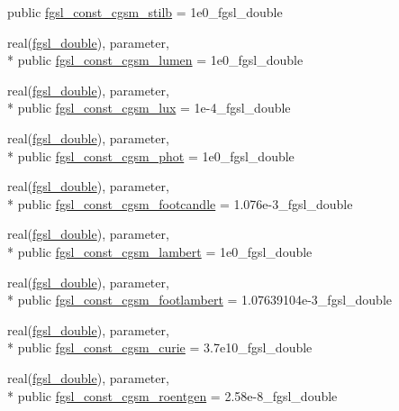 \begin{DoxyCompactItemize}
public \hyperlink{classfgsl_a8f6eb902874b66bc00a4959e7444cb1a}{fgsl\-\_\-const\-\_\-cgsm\-\_\-stilb} = 1e0\-\_\-fgsl\-\_\-double
\item 
real(\hyperlink{classfgsl_a9af5113378e0f000eb479d3f90196ddf}{fgsl\-\_\-double}), parameter, \\*
public \hyperlink{classfgsl_a754f063aac1363ab86693605311aeaf8}{fgsl\-\_\-const\-\_\-cgsm\-\_\-lumen} = 1e0\-\_\-fgsl\-\_\-double
\item 
real(\hyperlink{classfgsl_a9af5113378e0f000eb479d3f90196ddf}{fgsl\-\_\-double}), parameter, \\*
public \hyperlink{classfgsl_aba54a122b0e64f01ac54513a4a0f6a9f}{fgsl\-\_\-const\-\_\-cgsm\-\_\-lux} = 1e-\/4\-\_\-fgsl\-\_\-double
\item 
real(\hyperlink{classfgsl_a9af5113378e0f000eb479d3f90196ddf}{fgsl\-\_\-double}), parameter, \\*
public \hyperlink{classfgsl_a97e19ca0cdcef10fb78328e155bc5671}{fgsl\-\_\-const\-\_\-cgsm\-\_\-phot} = 1e0\-\_\-fgsl\-\_\-double
\item 
real(\hyperlink{classfgsl_a9af5113378e0f000eb479d3f90196ddf}{fgsl\-\_\-double}), parameter, \\*
public \hyperlink{classfgsl_ab94d2a4bddeb2056b97285714a740131}{fgsl\-\_\-const\-\_\-cgsm\-\_\-footcandle} = 1.\-076e-\/3\-\_\-fgsl\-\_\-double
\item 
real(\hyperlink{classfgsl_a9af5113378e0f000eb479d3f90196ddf}{fgsl\-\_\-double}), parameter, \\*
public \hyperlink{classfgsl_a9dcbf51e3d416e2da01a503e5ba573bc}{fgsl\-\_\-const\-\_\-cgsm\-\_\-lambert} = 1e0\-\_\-fgsl\-\_\-double
\item 
real(\hyperlink{classfgsl_a9af5113378e0f000eb479d3f90196ddf}{fgsl\-\_\-double}), parameter, \\*
public \hyperlink{classfgsl_a392158d18a3d487acc9ed9d88636066c}{fgsl\-\_\-const\-\_\-cgsm\-\_\-footlambert} = 1.\-07639104e-\/3\-\_\-fgsl\-\_\-double
\item 
real(\hyperlink{classfgsl_a9af5113378e0f000eb479d3f90196ddf}{fgsl\-\_\-double}), parameter, \\*
public \hyperlink{classfgsl_a1a2ad0a32e7001630dc57fb05a13896b}{fgsl\-\_\-const\-\_\-cgsm\-\_\-curie} = 3.\-7e10\-\_\-fgsl\-\_\-double
\item 
real(\hyperlink{classfgsl_a9af5113378e0f000eb479d3f90196ddf}{fgsl\-\_\-double}), parameter, \\*
public \hyperlink{classfgsl_a081808c3b3b7297c71e015034c089d04}{fgsl\-\_\-const\-\_\-cgsm\-\_\-roentgen} = 2.\-58e-\/8\-\_\-fgsl\-\_\-double

\end{DoxyCompactItemize}
